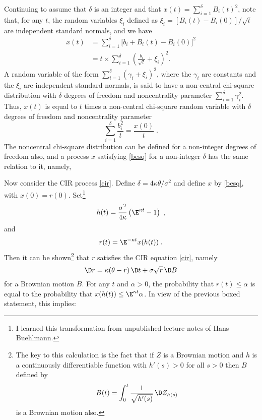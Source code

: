 Continuing to assume that $\delta$ is an integer and that $x(t) = \sum_{i=1}^\delta B_i(t)^2$, note that, for any $t$, the random variables $\xi_i$ defined as  $\xi_i = [B_i(t)-B_i(0)]/\sqrt{t}$ are independent  standard normals, and we have
\begin{align*}
x(t) &= \sum_{i=1}^\delta \big[b_i + B_i(t)-B_i(0)\big]^2\\
&= t\times \sum_{i=1}^\delta \left(\frac{b_i}{\sqrt{t}} + \xi_i\right)^2.
\end{align*}
A random variable of the form 
$\sum_{i=1}^\delta \left(\gamma_i + \xi_i\right)^2$, where the $\gamma_i$ are constants and the $\xi_i$ are independent standard normals, is said to have a non-central chi-square distribution with $\delta$ degrees of freedom and noncentrality parameter $\sum_{i=1}^\delta \gamma_i^2$.  Thus, $x(t)$ is equal to $t$ times a non-central chi-square random variable with $\delta$ degrees of freedom and noncentrality parameter 
$$\sum_{i=1}^\delta \frac{b_i^2}{t} = \frac{x(0)}{t}\; .$$
The noncentral chi-square distribution can be defined for a non-integer degrees of freedom also, and a process $x$ satisfying \eqref{besq} for a non-integer $\delta$ has the same relation to it, namely, 

Now consider the CIR process \eqref{cir}.  Define $\delta = 4 \kappa
\theta/ \sigma^2$ and define $x$ by  \eqref{besq}, with $x(0)= r(0)$.  Set\footnote{I learned this transformation from unpublished lecture notes of Hans Buehlmann.}
$$h(t)=\frac{ \sigma^2}{4 \kappa} \left( \E^{\kappa t}-1 \right)\; ,$$
and
$$r(t) = \E^{-\kappa t}x(h(t))\; .$$
Then  it can be shown\footnote{The key to this calculation is the fact that if $Z$ is a Brownian motion and $h$ is a continuously differentiable function with $h'(s)>0$ for all $s>0$ then $B$ defined by $$B(t) = \int_0^t \frac{1}{\sqrt{h'(s)}}\,\D Z_{h(s)}$$
is a Brownian motion also.}
that $r$ satisfies the CIR equation \eqref{cir}, namely
\begin{equation}\label{cir17}
\D r = \kappa(\theta-r)\,\D t + \sigma\sqrt{r}\,\D B
\end{equation}
for a Brownian motion $B$.  For any $t$ and $\alpha>0$, the probability that $r(t) \leq \alpha$ is equal to the probability that $x(h(t)) \leq \E^{\kappa t}\alpha$.  In view of the previous boxed statement, this implies:  

